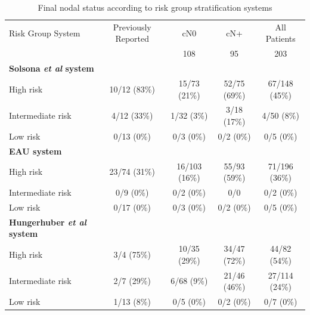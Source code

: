 \documentclass[11pt,letterpaper]{article}\usepackage[]{graphicx}\usepackage[]{color}
\begin{document}
\begin{multicols}{2}
\begin{table}
\centering
        \caption{Final nodal status according to risk group stratification systems}
        \label{FinalNodal}
\begin{tabular}{lcccc}
\hline 
Risk Group System & Previously Reported & cN0 & cN+ & All Patients \\
\ & \ & 108 & 95 & 203 \\
\hline
\textbf{Solsona \emph{et al} system} & \ & \ & \ & \ \\
        \hspace{2ex}High risk & 10/12 (83\%)
                & 15/73 (21\%)
                & 52/75 (69\%)
                & 67/148 (45\%) \\
        \hspace{2ex}Intermediate risk & 4/12 (33\%)
                & 1/32 (3\%)
                & 3/18 (17\%)
                & 4/50 (8\%) \\
        \hspace{2ex}Low risk & 0/13 (0\%)
                & 0/3 (0\%)
                & 0/2 (0\%)
                & 0/5 (0\%) \\
\textbf{EAU system} & \ & \ & \ & \ \\
        \hspace{2ex}High risk & 23/74 (31\%)
                & 16/103 (16\%)
                & 55/93 (59\%)
                & 71/196 (36\%) \\
        \hspace{2ex}Intermediate risk & 0/9 (0\%)
                & 0/2 (0\%)
                & 0/0 %
                & 0/2 (0\%) \\
        \hspace{2ex}Low risk & 0/17 (0\%)
                & 0/3 (0\%)
                & 0/2 (0\%)
                & 0/5 (0\%) \\
\textbf{Hungerhuber \emph{et al} system} & \ & \ & \ & \ \\
        \hspace{2ex}High risk & 3/4 (75\%)
                & 10/35 (29\%)
                & 34/47 (72\%)
                & 44/82 (54\%) \\
        \hspace{2ex}Intermediate risk & 2/7 (29\%)
                & 6/68 (9\%)
                & 21/46 (46\%)
                & 27/114 (24\%) \\
        \hspace{2ex}Low risk & 1/13 (8\%)
                & 0/5 (0\%)
                & 0/2 (0\%)
                & 0/7 (0\%) \\
\hline 
\end{tabular}
\end{table}



\end{multicols}
\end{document}
